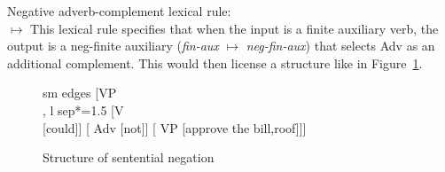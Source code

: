\documentclass[output=paper
	        ,collection
	        ,collectionchapter
 	        ,biblatex
                ,babelshorthands
                ,newtxmath
                ,draftmode
                ,colorlinks, citecolor=brown
]{langscibook}
\begin{document}
{\begin{exe}
\begin{xlist}
\begin{exe}
\begin{xlist}
\ea
Negative adverb-complement lexical rule:\\
 $\mapsto$
\z
%
This lexical rule specifies that when the input is a finite auxiliary verb,
the output is a neg-finite auxiliary (\textit{fin-aux} $\mapsto$ \textit{neg-fin-aux})
that selects Adv as an additional complement. This would then
license a structure like in Figure~\ref{negation-fig:6}.


\begin{figure}
	\begin{forest}
		sm edges
		[VP\\
		, l sep*=1.5
			[V\\
				[could]]
			[ Adv
				[not]]
			[ VP
				[approve the bill,roof]]]
	\end{forest}
\caption{Structure of sentential negation}\label{negation-fig:6}
\end{figure}


\end{xlist}
\end{exe}
\end{xlist}
\end{exe}}
\end{document}
